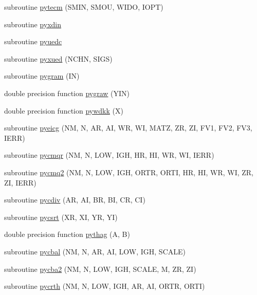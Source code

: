 \begin{DoxyCompactItemize}
\item 
subroutine \hyperlink{pythia-6_84_824_8f_a704cb09d423c8653c6bdd905afbaa35f}{pytecm} (S\+M\+I\+N, S\+M\+O\+U, W\+I\+D\+O, I\+O\+P\+T)
\item 
subroutine \hyperlink{pythia-6_84_824_8f_ab95e134e2b1bd1f755046578bf681217}{pyxdin}
\item 
subroutine \hyperlink{pythia-6_84_824_8f_ad4589c4d52b9eb7dbb722acc463b8ceb}{pyuedc}
\item 
subroutine \hyperlink{pythia-6_84_824_8f_a6934d9dda7d346e7f4173dcf9566e12d}{pyxued} (N\+C\+H\+N, S\+I\+G\+S)
\item 
subroutine \hyperlink{pythia-6_84_824_8f_a248b5187a6bf187f6d5daff60b824804}{pygram} (I\+N)
\item 
double precision function \hyperlink{pythia-6_84_824_8f_a1fbed028d71b3534800710e4cb3ece4c}{pygraw} (Y\+I\+N)
\item 
double precision function \hyperlink{pythia-6_84_824_8f_ac294a21a6c81f3eb018f2b493dd409fc}{pywdkk} (X)
\item 
subroutine \hyperlink{pythia-6_84_824_8f_a06f88a031d752be8caffae474a959a6f}{pyeicg} (N\+M, N, A\+R, A\+I, W\+R, W\+I, M\+A\+T\+Z, Z\+R, Z\+I, F\+V1, F\+V2, F\+V3, I\+E\+R\+R)
\item 
subroutine \hyperlink{pythia-6_84_824_8f_a13d9dca91a2ba931501b34c8d124f207}{pycmqr} (N\+M, N, L\+O\+W, I\+G\+H, H\+R, H\+I, W\+R, W\+I, I\+E\+R\+R)
\item 
subroutine \hyperlink{pythia-6_84_824_8f_a221a1006fd5f50c86615e419ce6a5c67}{pycmq2} (N\+M, N, L\+O\+W, I\+G\+H, O\+R\+T\+R, O\+R\+T\+I, H\+R, H\+I, W\+R, W\+I, Z\+R, Z\+I, I\+E\+R\+R)
\item 
subroutine \hyperlink{pythia-6_84_824_8f_ab6dc09395d1c9190db8e6b5a3c8af3af}{pycdiv} (A\+R, A\+I, B\+R, B\+I, C\+R, C\+I)
\item 
subroutine \hyperlink{pythia-6_84_824_8f_a26a8a92473a9eb985c72ec3c132f7b85}{pycsrt} (X\+R, X\+I, Y\+R, Y\+I)
\item 
double precision function \hyperlink{pythia-6_84_824_8f_ac7f36e7a75160e5ab83eae9147120bd1}{pythag} (A, B)
\item 
subroutine \hyperlink{pythia-6_84_824_8f_a91f56276e55e79b691dcf7a9b7d52dae}{pycbal} (N\+M, N, A\+R, A\+I, L\+O\+W, I\+G\+H, S\+C\+A\+L\+E)
\item 
subroutine \hyperlink{pythia-6_84_824_8f_a4bf2dad3f00ccb67ad7770282f83c36e}{pycba2} (N\+M, N, L\+O\+W, I\+G\+H, S\+C\+A\+L\+E, M, Z\+R, Z\+I)
\item 
subroutine \hyperlink{pythia-6_84_824_8f_a0d0725449c106999235e1a804c22e4e1}{pycrth} (N\+M, N, L\+O\+W, I\+G\+H, A\+R, A\+I, O\+R\+T\+R, O\+R\+T\+I)

\end{DoxyCompactItemize}

